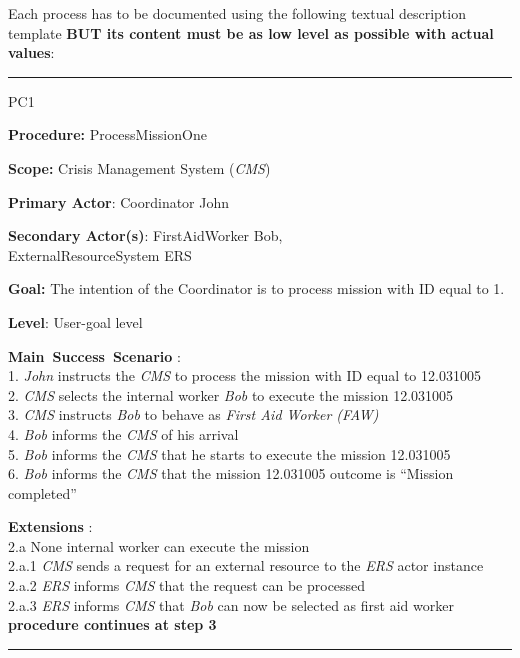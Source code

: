 Each process has to be documented using the following textual description
template \cite{armour01usecase} \textbf{BUT its content must be as low level as possible with actual values}:
\vspace{0.5cm}
\hrule
\begin{lyxlist}{PC1}
\small{
\item [\textbf{Procedure:}] ProcessMissionOne
\item [\textbf{Scope:}] Crisis Management System (\emph{CMS})
\item [\textbf{Primary Actor}:] Coordinator John
\item [\textbf{Secondary Actor(s)}:] FirstAidWorker Bob,\\
                  ExternalResourceSystem ERS
\item [\textbf{Goal:}] The intention of the Coordinator is to process mission
with ID equal to 1.
\item [\textbf{Level}:] User-goal level
\item [\textbf{Main~Success~Scenario}]:\\
1. \emph{John} instructs the \emph{CMS} to process the mission with ID equal to 12.031005\\
2. \emph{CMS} selects the internal worker \emph{Bob} to execute the mission 12.031005\\
3. \emph{CMS} instructs \emph{Bob} to behave as \emph{First Aid Worker (FAW)}\\
4. \emph{Bob} informs the \emph{CMS} of his arrival\\
5. \emph{Bob} informs the \emph{CMS} that he starts to execute the mission 12.031005\\
6. \emph{Bob} informs the \emph{CMS} that the mission 12.031005 outcome is ``Mission completed''


\item [\textbf{Extensions}]:\\
2.a None internal worker can execute the mission\\
\hspace*{0.5cm} 2.a.1 \emph{CMS} sends a request for an external resource to the \emph{ERS} actor instance\\
\hspace*{0.5cm} 2.a.2 \emph{ERS} informs \emph{CMS} that the request can be processed\\
\hspace*{0.5cm} 2.a.3 \emph{ERS} informs \emph{CMS} that \emph{Bob} can now be selected as first aid worker\\
\hspace*{0.5cm} \textbf{procedure continues at step 3}

}

\end{lyxlist}
\hrule
\vspace{0.5cm}




